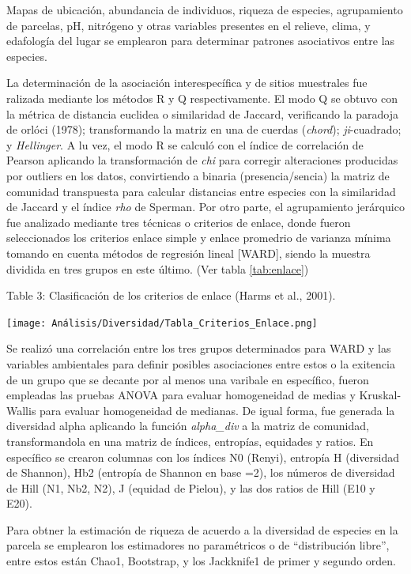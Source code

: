 \documentclass[11pt,]{article}
\begin{document}
Mapas de ubicación, abundancia de individuos, riqueza de especies,
agrupamiento de parcelas, pH, nitrógeno y otras variables presentes en
el relieve, clima, y edafología del lugar se emplearon para determinar
patrones asociativos entre las especies.

La determinación de la asociación interespecífica y de sitios muestrales
fue ralizada mediante los métodos R y Q respectivamente. El modo Q se
obtuvo con la métrica de distancia euclidea o similaridad de Jaccard,
verificando la paradoja de orlóci (1978); transformando la matriz en una
de cuerdas (\emph{chord}); \emph{ji}-cuadrado; y \emph{Hellinger}. A lu
vez, el modo R se calculó con el índice de correlación de Pearson
aplicando la transformación de \emph{chi} para corregir alteraciones
producidas por outliers en los datos, convirtiendo a binaria
(presencia/sencia) la matriz de comunidad transpuesta para calcular
distancias entre especies con la similaridad de Jaccard y el índice
\emph{rho} de Sperman. Por otro parte, el agrupamiento jerárquico fue
analizado mediante tres técnicas o criterios de enlace, donde fueron
seleccionados los criterios enlace simple y enlace promedrio de varianza
mínima tomando en cuenta métodos de regresión lineal {[}WARD{]}, siendo
la muestra dividida en tres grupos en este último. (Ver tabla
\ref{tab:enlace})

Table 3: Clasificación de los criterios de enlace (Harms et al.,
2001).\label{tab:enlace}

\texttt{[image: Análisis/Diversidad/Tabla\_Criterios\_Enlace.png]}
\textbar{}

Se realizó una correlación entre los tres grupos determinados para WARD
y las variables ambientales para definir posibles asociaciones entre
estos o la exitencia de un grupo que se decante por al menos una
varibale en específico, fueron empleadas las pruebas ANOVA para evaluar
homogeneidad de medias y Kruskal-Wallis para evaluar homogeneidad de
medianas. De igual forma, fue generada la diversidad alpha aplicando la
función \emph{alpha\_div} a la matriz de comunidad, transformandola en
una matriz de índices, entropías, equidades y ratios. En específico se
crearon columnas con los índices N0 (Renyi), entropía H (diversidad de
Shannon), Hb2 (entropía de Shannon en base =2), los números de
diversidad de Hill (N1, Nb2, N2), J (equidad de Pielou), y las dos
ratios de Hill (E10 y E20).

Para obtner la estimación de riqueza de acuerdo a la diversidad de
especies en la parcela se emplearon los estimadores no paramétricos o de
``distribución libre'', entre estos están Chao1, Bootstrap, y los
Jackknife1 de primer y segundo orden.
\end{document}
